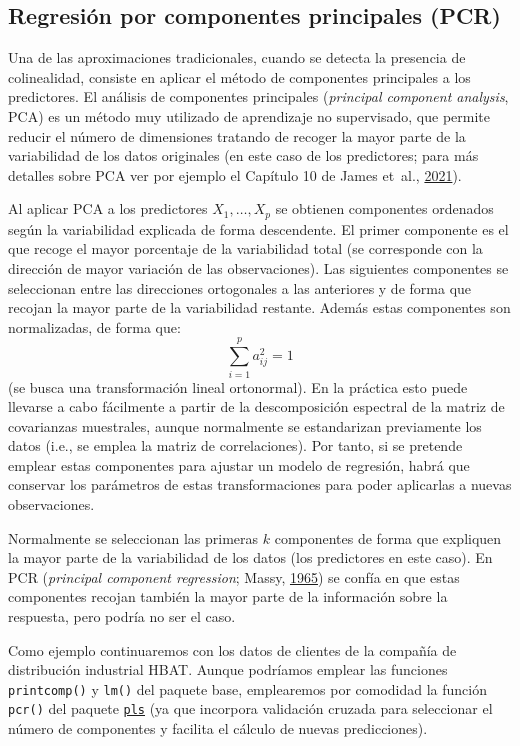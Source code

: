 \documentclass[
  spanish,
]{book}
\theoremstyle{break}
\theoremstyle{definition}
\theoremstyle{definition}
\theoremstyle{definition}
\theoremstyle{remark}
\begin{document}
\hypertarget{regresiuxf3n-por-componentes-principales-pcr}{%
\subsection{Regresión por componentes principales (PCR)}\label{regresiuxf3n-por-componentes-principales-pcr}}

Una de las aproximaciones tradicionales, cuando se detecta la presencia de colinealidad, consiste en aplicar el método de componentes principales a los predictores.
El análisis de componentes principales (\emph{principal component analysis}, PCA) es un método muy utilizado de aprendizaje no supervisado, que permite reducir el número de dimensiones tratando de recoger la mayor parte de la variabilidad de los datos originales (en este caso de los predictores; para más detalles sobre PCA ver por ejemplo el Capítulo 10 de James et~al., \protect\hyperlink{ref-james2021introduction}{2021}).

Al aplicar PCA a los predictores \(X_1, \ldots, X_p\) se obtienen componentes ordenados según la variabilidad explicada de forma descendente.
El primer componente es el que recoge el mayor porcentaje de la variabilidad total (se corresponde con la dirección de mayor variación de las observaciones).
Las siguientes componentes se seleccionan entre las direcciones ortogonales a las anteriores y de forma que recojan la mayor parte de la variabilidad restante.
Además estas componentes son normalizadas, de forma que:
\[\sum_{i=1}^p a_{ij}^2 = 1\]
(se busca una transformación lineal ortonormal).
En la práctica esto puede llevarse a cabo fácilmente a partir de la descomposición espectral de la matriz de covarianzas muestrales, aunque normalmente se estandarizan previamente los datos (i.e., se emplea la matriz de correlaciones).
Por tanto, si se pretende emplear estas componentes para ajustar un modelo de regresión, habrá que conservar los parámetros de estas transformaciones para poder aplicarlas a nuevas observaciones.

Normalmente se seleccionan las primeras \(k\) componentes de forma que expliquen la mayor parte de la variabilidad de los datos (los predictores en este caso).
En PCR (\emph{principal component regression}; Massy, \protect\hyperlink{ref-massy1965principal}{1965}) se confía en que estas componentes recojan también la mayor parte de la información sobre la respuesta, pero podría no ser el caso.

Como ejemplo continuaremos con los datos de clientes de la compañía de distribución industrial HBAT.
Aunque podríamos emplear las funciones \texttt{printcomp()} y \texttt{lm()} del paquete base, emplearemos por comodidad la función \texttt{pcr()} del paquete \href{https://mevik.net/work/software/pls.html}{\texttt{pls}} (ya que incorpora validación cruzada para seleccionar el número de componentes y facilita el cálculo de nuevas predicciones).
\end{document}
